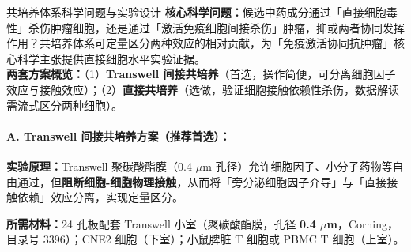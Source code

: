 \documentclass[12pt,a4paper,twoside]{article}
\begin{document}
\begin{infobox}{共培养体系科学问题与实验设计}
\textbf{核心科学问题：}候选中药成分通过「直接细胞毒性」杀伤肿瘤细胞，还是通过「激活免疫细胞间接杀伤」肿瘤，抑或两者协同发挥作用？共培养体系可定量区分两种效应的相对贡献，为「免疫激活协同抗肿瘤」核心科学主张提供直接细胞水平实验证据。\\
\textbf{两套方案概览：}（1）\textbf{Transwell 间接共培养}（首选，操作简便，可分离细胞因子效应与接触效应）；（2）\textbf{直接共培养}（选做，验证细胞接触依赖性杀伤，数据解读需流式区分两种细胞）。
\end{infobox}

\paragraph{A. Transwell 间接共培养方案（推荐首选）：}

\textbf{实验原理：}Transwell 聚碳酸酯膜（0.4 $\mu$m 孔径）允许细胞因子、小分子药物等自由通过，但\textbf{阻断细胞-细胞物理接触}，从而将「旁分泌细胞因子介导」与「直接接触依赖」效应分离，实现定量区分。

\textbf{所需材料：}24 孔板配套 Transwell 小室（聚碳酸酯膜，孔径 \textbf{0.4 $\mu$m}，Corning，目录号 3396）；CNE2 细胞（下室）；小鼠脾脏 T 细胞或 PBMC T 细胞（上室）。
\end{document}
